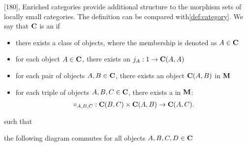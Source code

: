\begin{definition}\label{def:enriched_category}\cite{MacLane1994}[180],\cite{nLab:enriched_category}
  Enriched categories provide additional structure to the morphism sets of locally small categories. The definition can be compared with\cref{def:category}. We say that \( \operatorname{\mathbf{C}} \) is an  if
  \begin{itemize}
    \item there exists a class of objects, where the membership is denoted as \( A \in \operatorname{\mathbf{C}} \)
    \item for each object \( A \in \operatorname{\mathbf{C}} \), there exists an  \( j_A: 1 \to \operatorname{\mathbf{C}}(A, A) \)
    \item for each pair of objects \( A, B \in \operatorname{\mathbf{C}} \), there exists an object \( \operatorname{\mathbf{C}}(A, B) \) in \( \operatorname{\mathbf{M}} \)
    \item for each triple of objects \( A, B, C \in \operatorname{\mathbf{C}} \), there exists a  in \( \operatorname{\mathbf{M}} \):
    \begin{align*}
      \circ_{A,B,C}: {\operatorname{\mathbf{C}}}(B, C) \times {\operatorname{\mathbf{C}}}(A, B) \to {\operatorname{\mathbf{C}}}(A, C).
    \end{align*}
  \end{itemize}
  such that
  \begin{defenum}
    \item the following diagram commutes for all objects \( A, B, C, D \in \operatorname{\mathbf{C}} \)
    \begin{Center}
    \end{Center}


\end{defenum}
\end{definition}
